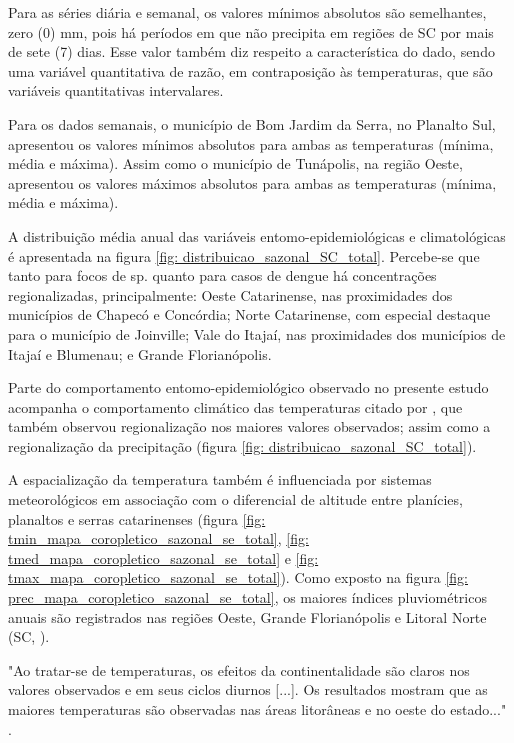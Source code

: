 \indent Para as séries diária e semanal, os valores mínimos absolutos são semelhantes, zero (0) mm, pois há períodos em que não precipita em regiões de \acrlong{SC} por mais de sete (7) dias. Esse valor também diz respeito a característica do dado, sendo uma variável quantitativa de razão, em contraposição às temperaturas, que são variáveis quantitativas intervalares.

\indent Para os dados semanais, o município de Bom Jardim da Serra, no Planalto Sul, apresentou os valores mínimos absolutos para ambas as temperaturas (mínima, média e máxima). Assim como o município de Tunápolis, na região Oeste, apresentou os valores máximos absolutos para ambas as temperaturas (mínima, média e máxima).

\indent A distribuição média anual das variáveis entomo-epidemiológicas e climatológicas é apresentada na figura \ref{fig: distribuicao_sazonal_SC_total}. Percebe-se que tanto para focos de  sp. quanto para casos de dengue há concentrações regionalizadas, principalmente: Oeste Catarinense, nas proximidades dos municípios de Chapecó e Concórdia; Norte Catarinense, com especial destaque para o município de Joinville; Vale do Itajaí, nas proximidades dos municípios de Itajaí e Blumenau; e Grande Florianópolis.

\indent Parte do comportamento entomo-epidemiológico observado no presente estudo acompanha o comportamento climático das temperaturas citado por , que também observou regionalização nos maiores valores observados; assim como a regionalização da precipitação (figura \ref{fig: distribuicao_sazonal_SC_total}).

\indent A espacialização da temperatura também é influenciada por sistemas meteorológicos em associação com o diferencial de altitude entre planícies, planaltos e serras catarinenses (figura \ref{fig: tmin_mapa_coropletico_sazonal_se_total}, \ref{fig: tmed_mapa_coropletico_sazonal_se_total} e \ref{fig: tmax_mapa_coropletico_sazonal_se_total}). Como exposto na figura \ref{fig: prec_mapa_coropletico_sazonal_se_total}, os maiores índices pluviométricos anuais são registrados nas regiões Oeste, Grande Florianópolis e Litoral Norte (\acrlong{SC}, \citeyear{AtlasSCnatureza}).

\newpage
\begin{citacao}
"Ao tratar-se de temperaturas, os efeitos da continentalidade são claros nos valores observados e em seus ciclos diurnos [...]. Os resultados mostram que as maiores temperaturas são observadas nas áreas litorâneas e no oeste do estado..." \cite[pg-152]{Guerra2023Regionalizacao}.
\end{citacao}

